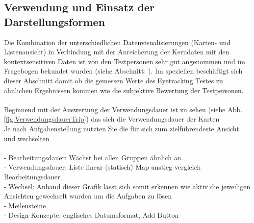 \documentclass[Bachelorarbeit.tex]{subfiles}
\begin{document}
\subsection{Verwendung und Einsatz der Darstellungsformen}
Die Kombination der unterschiedlichen Datenvisualisierungen (Karten- und Listenansicht) in Verbindung mit der Anreicherung der Kerndaten mit den kontextsensitiven Daten ist von den Testpersonen sehr gut angenommen und im Fragebogen bekundet wurden (siehe Abschnitt: ).
Im speziellen beschäftigt sich dieser Abschnitt damit ob die gemessen Werte des Eyetracking Testes zu ähnlichen Ergebnissen kommen wie die subjektive Bewertung der Testpersonen.\\
\\
Beginnend mit der Auswertung der Verwendungsdauer ist zu sehen (siehe Abb. \ref{fig:VerwendungsdauerTrip}) das sich die Verwendungsdauer der Karten
\\
Je nach Aufgabenstellung nutzten Sie die für sich zum zielführendeste Ansicht und wechselten\\
\\
- Bearbeitungsdauer: Wächst bei allen Gruppen ähnlich an.\\
- Verwendungsdauer: Liste linear (statisch) Map anstieg vergleich Bearbeitungsdauer. \\
- Wechsel: Anhand dieser Grafik lässt sich somit erkennen wie aktiv die jeweiligen Ansichten gewechselt wurden um die Aufgaben zu lösen\\
- Meilensteine\\
- Design Konzepte: englisches Datumsformat, Add Button
\end{document}
